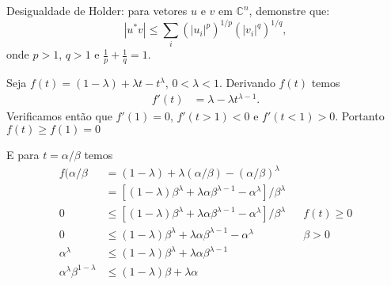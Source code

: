 % 
% 
% 
% 
% 
% 
%
%
\begin{questions}
     Desigualdade de Holder: para vetores $u$ e $v$ em $\mathbb{C}^n$, demonstre que:
    \[
    | u^* v | \leq \sum_i \left( | u_i |^p \right)^{1/p} \left( | v_i |^q \right)^{1/q},
    \]
    onde $p > 1$, $q > 1$ e $\frac{1}{p} + \frac{1}{q} = 1$.
    \begin{solution}
        Seja $f(t) = \left( 1 - \lambda \right) + \lambda t - t^\lambda$, $0 < \lambda < 1$. Derivando $f(t)$ temos
        \begin{align*}
            f'(t) &= \lambda - \lambda t^{\lambda - 1}.
        \end{align*}
        Verificamos ent\~{a}o que $f'(1) = 0$, $f'(t > 1) < 0$ e $f'(t < 1) > 0$. Portanto $f(t) \geq f(1) = 0$ 

        E para $t = \alpha / \beta$ temos
        \begin{align*}
            f(\alpha / \beta &= \left( 1 - \lambda \right) + \lambda \left( \alpha / \beta \right) - \left( \alpha / \beta \right)^\lambda \\
            &= \left[ \left( 1 - \lambda \right) \beta^\lambda + \lambda \alpha \beta^{\lambda - 1} - \alpha^\lambda \right] / \beta^\lambda \\
            0 &\leq \left[ \left( 1 - \lambda \right) \beta^\lambda + \lambda \alpha \beta^{\lambda - 1} - \alpha^\lambda \right] / \beta^\lambda && f(t) \geq 0 \\
            0 &\leq \left( 1 - \lambda \right) \beta^\lambda + \lambda \alpha \beta^{\lambda - 1} - \alpha^\lambda && \beta > 0 \\
            \alpha^\lambda &\leq \left( 1 - \lambda \right) \beta^\lambda + \lambda \alpha \beta^{\lambda - 1} \\
            \alpha^\lambda \beta^{1 - \lambda} &\leq \left( 1 - \lambda \right) \beta + \lambda \alpha
        \end{align*}


\end{solution}
\end{questions}
